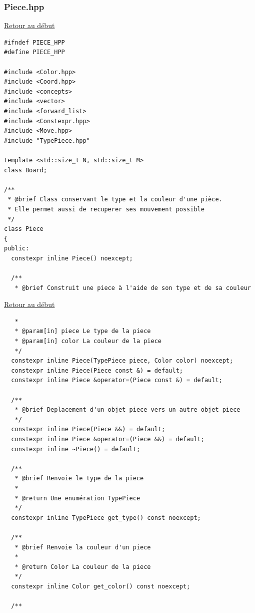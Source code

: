 {\begin{frame}[fragile]
\begin{verbatim}
\end{verbatim}
\end{frame}

\begin{frame}[fragile]
\label{Piece.hpp}
\frametitle{Piece.hpp}
\hyperlink{conclusion}{Retour au début}\newline
\begin{verbatim}
#ifndef PIECE_HPP
#define PIECE_HPP

#include <Color.hpp>
#include <Coord.hpp>
#include <concepts>
#include <vector>
#include <forward_list>
#include <Constexpr.hpp>
#include <Move.hpp>
#include "TypePiece.hpp"

template <std::size_t N, std::size_t M>
class Board;

/**
 * @brief Class conservant le type et la couleur d'une pièce.
 * Elle permet aussi de recuperer ses mouvement possible
 */
class Piece
{
public:
  constexpr inline Piece() noexcept;

  /**
   * @brief Construit une piece à l'aide de son type et de sa couleur
\end{verbatim}
\end{frame}

\begin{frame}[fragile]
\hyperlink{conclusion}{Retour au début}\newline
\begin{verbatim}
   *
   * @param[in] piece Le type de la piece
   * @param[in] color La couleur de la piece
   */
  constexpr inline Piece(TypePiece piece, Color color) noexcept;
  constexpr inline Piece(Piece const &) = default;
  constexpr inline Piece &operator=(Piece const &) = default;

  /**
   * @brief Deplacement d'un objet piece vers un autre objet piece
   */
  constexpr inline Piece(Piece &&) = default;
  constexpr inline Piece &operator=(Piece &&) = default;
  constexpr inline ~Piece() = default;

  /**
   * @brief Renvoie le type de la piece
   *
   * @return Une enumération TypePiece
   */
  constexpr inline TypePiece get_type() const noexcept;

  /**
   * @brief Renvoie la couleur d'un piece
   *
   * @return Color La couleur de la piece
   */
  constexpr inline Color get_color() const noexcept;

  /**
\end{verbatim}
\end{frame}

}
